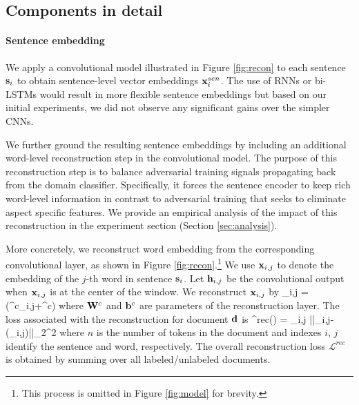 \subsection{Components in detail}


\paragraph{Sentence embedding} 
We apply a convolutional model illustrated in Figure \ref{fig:recon} to each sentence $\mathbf{s}_i$ to obtain sentence-level vector embeddings $\mathbf{x}^{sen}_i$. The use of RNNs or bi-LSTMs would result in more flexible sentence embeddings but based on our initial experiments, we did not observe any significant gains over the simpler CNNs. 



We further ground the resulting sentence embeddings by including an additional word-level reconstruction step in the convolutional model. The purpose of this reconstruction step is to balance adversarial training signals propagating back from the domain classifier. Specifically, it forces the sentence encoder to keep rich word-level information in contrast to adversarial training that seeks to eliminate aspect specific features. We provide an empirical analysis of the impact of this reconstruction in the experiment section (Section \ref{sec:analysis}).

More concretely, we reconstruct word embedding from the corresponding convolutional layer, as shown in Figure \ref{fig:recon}.\footnote{
This process is omitted in Figure \ref{fig:model} for brevity.} 
We use $\mathbf{x}_{i,j}$ to denote the embedding of the $j$-th word in sentence $\mathbf{s}_i$.
Let $\mathbf{h}_{i,j}$ be the convolutional output when $\mathbf{x}_{i,j}$ is at the center of the window. We reconstruct $\mathbf{x}_{i,j}$ by
\be
{}_{i,j} = \tanh(^c_{i,j}+^c)
\ee
where $\mathbf{W}^c$ and $\mathbf{b}^c$ are parameters of the reconstruction layer. The loss associated with the reconstruction for document $\mathbf{d}$ is 
\be
{}^{rec}() = \sum_{i,j} ||_{i,j}-\tanh(_{i,j})||_2^2
\ee
where $n$ is the number of tokens in the document and indexes $i$, $j$ identify the sentence and word, respectively. The overall reconstruction loss $\mathcal{L}^{rec}$ is obtained by summing over all labeled/unlabeled documents. 


